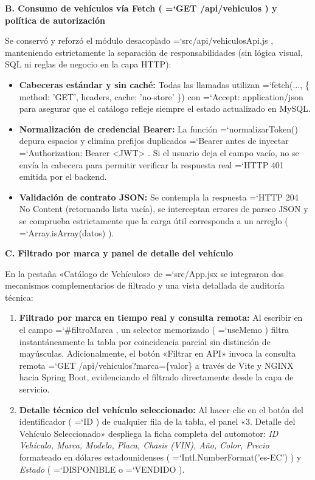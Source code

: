 \documentclass[11pt,a4paper]{article}
\renewcommand{\_}{\oldunderscore\allowbreak}
\DeclareRobustCommand{\texttt}[1]{%
  {\upshape\ttfamily\fontsize{9}{10.8}\selectfont\hyphenchar\font=`\-\relax #1}%
}
\begin{document}
\vspace{0.2cm}
\noindent\textbf{B. Consumo de vehículos vía Fetch (\texttt{GET /\allowbreak{}api/\allowbreak{}vehiculos}) y política de autorización}

\noindent Se conservó y reforzó el módulo desacoplado \texttt{src/\allowbreak{}api/\allowbreak{}vehiculosApi.\allowbreak{}js}, manteniendo estrictamente la separación de responsabilidades (sin lógica visual, SQL ni reglas de negocio en la capa HTTP):
\begin{itemize}[leftmargin=*,itemsep=2pt,topsep=1pt]
  \item \textbf{Cabeceras estándar y sin caché:} Todas las llamadas utilizan \texttt{fetch(..., \{ method: 'GET', headers, cache: 'no-store' \})} con \texttt{Accept: application/\allowbreak{}json} para asegurar que el catálogo refleje siempre el estado actualizado en MySQL.
  \item \textbf{Normalización de credencial Bearer:} La función \texttt{normalizarToken()} depura espacios y elimina prefijos duplicados \texttt{Bearer } antes de inyectar \texttt{Authorization: Bearer <JWT>}. Si el usuario deja el campo vacío, no se envía la cabecera para permitir verificar la respuesta real \texttt{HTTP 401} emitida por el backend.
  \item \textbf{Validación de contrato JSON:} Se contempla la respuesta \texttt{HTTP 204 No Content} (retornando lista vacía), se interceptan errores de parseo JSON y se comprueba estrictamente que la carga útil corresponda a un arreglo (\texttt{Array.\allowbreak{}isArray(datos)}).
\end{itemize}

\vspace{0.2cm}
\noindent\textbf{C. Filtrado por marca y panel de detalle del vehículo}

\noindent En la pestaña «Catálogo de Vehículos» de \texttt{src/App.jsx} se integraron dos mecanismos complementarios de filtrado y una vista detallada de auditoría técnica:
\begin{enumerate}[leftmargin=*,itemsep=2pt,topsep=1pt]
  \item \textbf{Filtrado por marca en tiempo real y consulta remota:} Al escribir en el campo \texttt{\#filtroMarca}, un selector memorizado (\texttt{useMemo}) filtra instantáneamente la tabla por coincidencia parcial sin distinción de mayúsculas. Adicionalmente, el botón «Filtrar en API» invoca la consulta remota \texttt{GET /\allowbreak{}api/\allowbreak{}vehiculos?\allowbreak{}marca=\allowbreak{}\{valor\}} a través de Vite y NGINX hacia Spring Boot, evidenciando el filtrado directamente desde la capa de servicio.
  \item \textbf{Detalle técnico del vehículo seleccionado:} Al hacer clic en el botón del identificador (\texttt{ID}) de cualquier fila de la tabla, el panel «3. Detalle del Vehículo Seleccionado» despliega la ficha completa del automotor: \textit{ID Vehículo, Marca, Modelo, Placa, Chasis (VIN), Año, Color, Precio} formateado en dólares estadounidenses (\texttt{Intl.\allowbreak{}NumberFormat('es-EC')}) y \textit{Estado} (\texttt{DISPONIBLE} o \texttt{VENDIDO}).
\end{enumerate}
\end{document}
